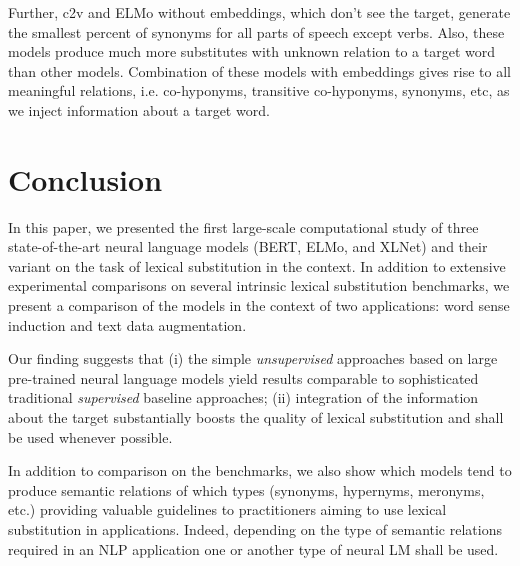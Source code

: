 \documentclass[11pt,a4paper]{article}
\begin{document}
Further, c2v and ELMo without embeddings, which don't see the target, generate the smallest percent of synonyms for all parts of speech except verbs. Also, these models produce much more substitutes with unknown relation to a target word than other models. Combination of these models with embeddings gives rise to all meaningful relations, i.e. co-hyponyms, transitive co-hyponyms, synonyms, etc, as we inject information about a target word.

\section{Conclusion}

In this paper, we presented the first large-scale computational study of three state-of-the-art neural language models (BERT, ELMo, and XLNet) and their variant on the task of lexical substitution in the context. In addition to extensive experimental comparisons on several intrinsic lexical substitution benchmarks, we present a comparison of the models in the context of two applications: word sense induction and text data augmentation. 

Our finding suggests that (i) the simple \textit{unsupervised} approaches based on large pre-trained neural language models yield results comparable to sophisticated traditional \textit{supervised} baseline approaches; (ii) integration of the information about the target substantially boosts the quality of lexical substitution and shall be used whenever possible. 

In addition to comparison on the benchmarks, we also show which models tend to produce semantic relations of which types (synonyms, hypernyms, meronyms, etc.) providing valuable guidelines to practitioners aiming to use lexical substitution in applications. Indeed, depending on the type of semantic relations required in an NLP application one or another type of neural LM shall be used. 






\end{document}

